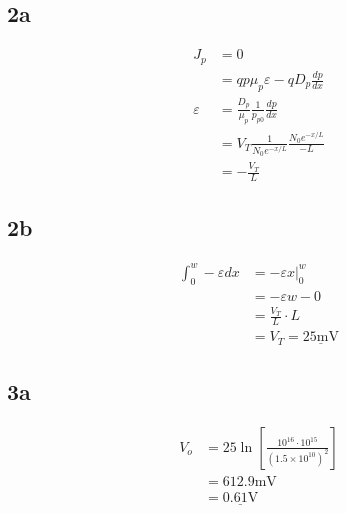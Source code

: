 \documentclass{article}
\begin{document}
\begin{multicols}{2}
    \subsection*{2a}
    \begin{align*}
        J_p         & = 0                                                \\
                    & = q p \mu_p \varepsilon - q D_p \frac{dp}{dx}      \\
        \varepsilon & = \frac{D_p}{\mu_p} \frac{1}{p_{p0}} \frac{dp}{dx} \\
                    & = V_T \frac{1}{N_0e^{-x/L}} \frac{N_0e^{-x/L}}{-L} \\
                    & = -\frac{V_T}{L}
    \end{align*}
    \subsection*{2b}
    \begin{align*}
        \int_0^w -\varepsilon dx & = \left.-\varepsilon x\right|^w_0       \\
                                 & = -\varepsilon w - 0                    \\
                                 & = \frac{ V_T}{L} \cdot L                \\
                                 & = V_T = \underline{25 \si{\milli\volt}}
    \end{align*}
    \subsection*{3a}
    \begin{align*}
        V_o & = 25 \ln \left[ \frac{10^{16}\cdot 10^{15}}{{\left( 1.5\times 10^{10} \right)}^2} \right] \\
            & = 612.9 \si{\milli\volt}                                                                  \\
            & = \underline{0.61 \si{\volt}}
    \end{align*}

\end{multicols}
\end{document}
